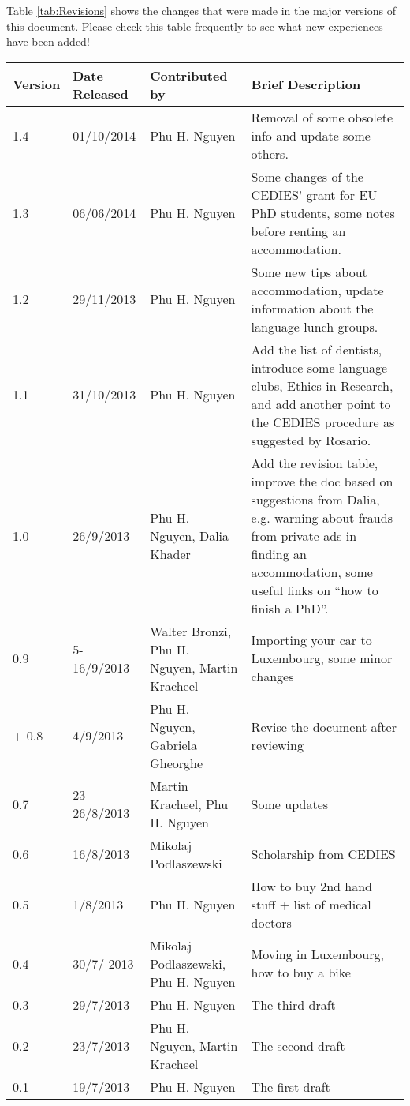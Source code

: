 \label{ssec:revisions}
Table \ref{tab:Revisions} shows the changes that were made in the major versions of this document. 
Please check this table frequently to see what new experiences have been added! 


\begin{center}

\begin{table*}[t!]\centering
\small
\caption{Document History and Version Control}    
 \begin{tabular}{ | l | l | p{3cm} | p{6cm} |}
  \hline
  Version & Date Released & Contributed by & Brief Description \\ \hline
 1.4 & 01/10/2014 & Phu H. Nguyen & Removal of some obsolete info and update some others.  \\ \hline    
  1.3 & 06/06/2014 & Phu H. Nguyen & Some changes of the CEDIES' grant for EU PhD students, some notes before renting an accommodation.  \\ \hline  
  1.2 & 29/11/2013 & Phu H. Nguyen & Some new tips about accommodation, update information about the language lunch groups.  \\ \hline  
  1.1 & 31/10/2013 & Phu H. Nguyen & Add the list of dentists, introduce some language clubs, Ethics in Research, and add another point to the CEDIES procedure as suggested by Rosario.  \\ \hline  
  1.0 & 26/9/2013 & Phu H. Nguyen, Dalia Khader & Add the revision table, improve the doc based on suggestions from Dalia, e.g. warning about frauds from private ads in finding an accommodation, some useful links on ``how to finish a PhD''.  \\ \hline
  0.9 & 5-16/9/2013 & Walter Bronzi, Phu H. Nguyen, Martin Kracheel & Importing your car to Luxembourg, some minor changes \\  \hline+
  0.8 & 4/9/2013 & Phu H. Nguyen, Gabriela Gheorghe & Revise the document after reviewing \\  \hline
  0.7 & 23-26/8/2013 & Martin Kracheel, Phu H. Nguyen & Some updates \\  \hline
  0.6 & 16/8/2013 & Mikolaj Podlaszewski & Scholarship from CEDIES \\  \hline
  0.5 & 1/8/2013 & Phu H. Nguyen & How to buy 2nd hand stuff + list of medical doctors \\  \hline
  0.4 & 30/7/ 2013 & Mikolaj Podlaszewski, Phu H. Nguyen & Moving in Luxembourg, how to buy a bike \\  \hline
  0.3 & 29/7/2013 & Phu H. Nguyen & The third draft \\    \hline
  0.2 & 23/7/2013 & Phu H. Nguyen, Martin Kracheel & The second draft \\  \hline
  0.1 & 19/7/2013 & Phu H. Nguyen & The first draft \\ \hline
	\end{tabular}
	\label{tab:Revisions}

\end{table*}
\end{center}